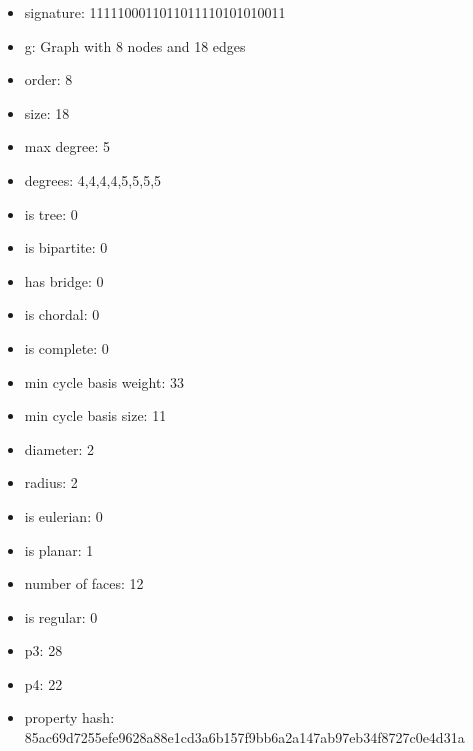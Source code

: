 \begin{itemize}
\item signature: 1111100011011011110101010011
\item g: Graph with 8 nodes and 18 edges
\item order: 8
\item size: 18
\item max degree: 5
\item degrees: 4,4,4,4,5,5,5,5
\item is tree: 0
\item is bipartite: 0
\item has bridge: 0
\item is chordal: 0
\item is complete: 0
\item min cycle basis weight: 33
\item min cycle basis size: 11
\item diameter: 2
\item radius: 2
\item is eulerian: 0
\item is planar: 1
\item number of faces: 12
\item is regular: 0
\item p3: 28
\item p4: 22
\item property hash: 85ac69d7255efe9628a88e1cd3a6b157f9bb6a2a147ab97eb34f8727c0e4d31a
\end{itemize}
\newpage
